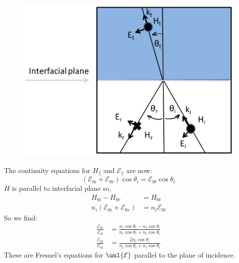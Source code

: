 \documentclass[a4paper, 11pt, normalem]{report}
\renewcommand\E{\mathcal{E}}
\newcommand\uE{\unl{\E}}
\begin{document}
\begin{figure}[H]
	\centering
	\includegraphics[scale=0.4]{parfres.png}
\end{figure}

The continuity equations for $H_{\parallel}$ and $\E_{\parallel}$ are now:
\begin{equation}
	(\E_{0i} + \E_{0r})\cos\theta_i = \E_{0t}\cos\theta_t
\end{equation}
$H$ is parallel to interfacial plane so,
\begin{align}
	H_{0i} - H_{0r} &= H_{0t} \\
	n_i(\E_{0i} + \E_{0r}) &= n_t\E_{0t}
\end{align}
So we find:
\begin{align}
	\frac{\E_{0r}}{\E_{0i}} &= \frac{n_i\cos\theta_t - n_t\cos\theta_i}{n_i\cos\theta_t + n_t\cos\theta_i} \\
	\frac{\E_{0t}}{\E_{0i}} &= \frac{2n_i\cos\theta_i}{n_i\cos\theta_t + n_t\cos\theta_t}
\end{align}
These are Fresnel's equations for $\uE$ parallel to the plane of incidence.
\end{document}

